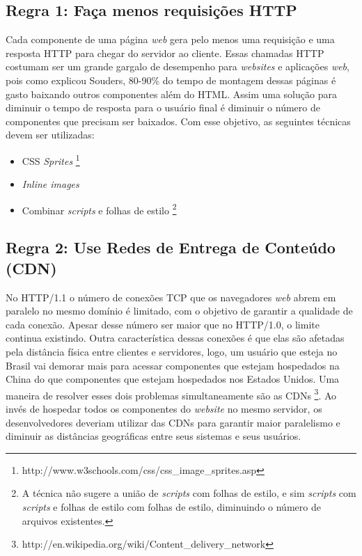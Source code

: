 \subsection{Regra 1: Faça menos requisições HTTP}
\label{subsec:highperformance_regra1}
Cada componente de uma página \textit{web} gera pelo menos uma requisição e uma resposta HTTP para chegar do servidor ao cliente. Essas chamadas HTTP costumam ser um grande gargalo de desempenho para \textit{websites} e aplicações \textit{web}, pois como explicou Souders, 80-90\% do tempo de montagem dessas páginas é gasto baixando outros componentes além do HTML. Assim uma solução para diminuir o tempo de resposta para o usuário final é diminuir o número de componentes que precisam ser baixados. Com esse objetivo, as seguintes técnicas devem ser utilizadas:
	\begin{itemize}
		\item CSS \textit{Sprites} \footnote{http://www.w3schools.com/css/css\_image\_sprites.asp}
		\item \textit{Inline images}
		\item Combinar \textit{scripts} e folhas de estilo \footnote{A técnica não sugere a união de \textit{scripts} com folhas de estilo, e sim \textit{scripts} com \textit{scripts} e folhas de estilo com folhas de estilo, diminuindo o número de arquivos existentes.}
	\end{itemize}

\subsection{Regra 2: Use Redes de Entrega de Conteúdo (CDN)}
\label{subsec:highperformance_regra2}
No HTTP/1.1 o número de conexões TCP que os navegadores \textit{web} abrem em paralelo no mesmo domínio é limitado, com o objetivo de garantir a qualidade de cada conexão. Apesar desse número ser maior que no HTTP/1.0, o limite continua existindo. Outra característica dessas conexões é que elas são afetadas pela distância física entre clientes e servidores, logo, um usuário que esteja no Brasil vai demorar mais para acessar componentes que estejam hospedados na China do que componentes que estejam hospedados nos Estados Unidos. Uma maneira de resolver esses dois problemas simultaneamente são as CDNs \footnote{http://en.wikipedia.org/wiki/Content\_delivery\_network}. Ao invés de hospedar todos os componentes do \textit{website} no mesmo servidor, os desenvolvedores deveriam utilizar das CDNs para garantir maior paralelismo e diminuir as distâncias geográficas entre seus sistemas e seus usuários.

